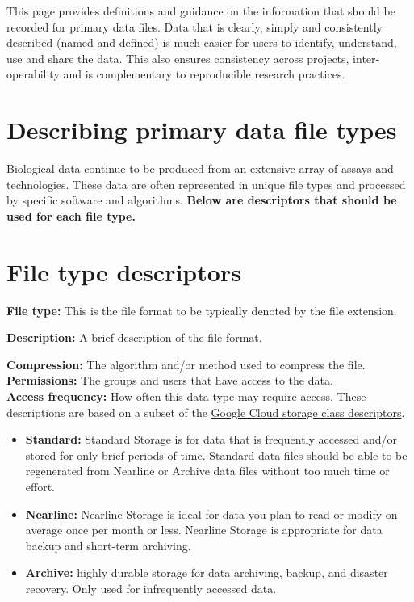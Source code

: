 \documentclass[
]{book}
\providecommand{\tightlist}{%
  \setlength{\itemsep}{0pt}\setlength{\parskip}{0pt}}
\begin{document}
This page provides definitions and guidance on the information that should be recorded for primary data files. Data that is clearly, simply and consistently described (named and defined) is much easier for users to identify, understand, use and share the data. This also ensures consistency across projects, inter-operability and is complementary to reproducible research practices.

\hypertarget{describing-primary-data-file-types}{%
\section{Describing primary data file types}\label{describing-primary-data-file-types}}

Biological data continue to be produced from an extensive array of assays and technologies. These data are often represented in unique file types and processed by specific software and algorithms. \textbf{Below are descriptors that should be used for each file type.}

\hypertarget{file-type-descriptors}{%
\section{File type descriptors}\label{file-type-descriptors}}

\textbf{File type:} This is the file format to be typically denoted by the file extension.

\textbf{Description:} A brief description of the file format.

\textbf{Compression:} The algorithm and/or method used to compress the file.\\

\textbf{Permissions:} The groups and users that have access to the data.\\

\textbf{Access frequency:} How often this data type may require access. These descriptions are based on a subset of the \href{https://cloud.google.com/storage/docs/storage-classes\#classes}{Google Cloud storage class descriptors}.

\begin{itemize}
\tightlist
\item
  \textbf{Standard:} Standard Storage is for data that is frequently accessed and/or stored for only brief periods of time. Standard data files should be able to be regenerated from Nearline or Archive data files without too much time or effort.
\item
  \textbf{Nearline:} Nearline Storage is ideal for data you plan to read or modify on average once per month or less. Nearline Storage is appropriate for data backup and short-term archiving.
\item
  \textbf{Archive:} highly durable storage for data archiving, backup, and disaster recovery. Only used for infrequently accessed data.
\end{itemize}
\end{document}
